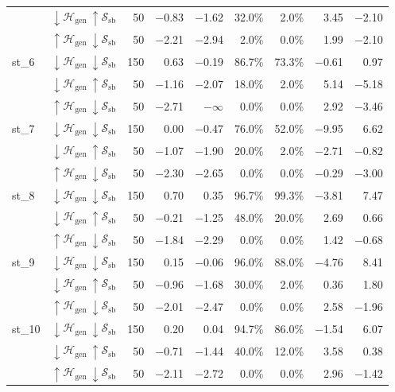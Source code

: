 \begin{tabular}{llrrrrrrr}
 & $\downarrow \mathcal{H}_\mathrm{gen}\ \uparrow \mathcal{S}_\mathrm{sb}$ & 50 & $-$0.83 & $-$1.62 & 32.0\% & 2.0\% & 3.45 & $-$2.10 \\
 & $\uparrow \mathcal{H}_\mathrm{gen}\ \downarrow \mathcal{S}_\mathrm{sb}$ & 50 & $-$2.21 & $-$2.94 & 2.0\% & 0.0\% & 1.99 & $-$2.10 \\
\midrule
st\_6 & $\downarrow \mathcal{H}_\mathrm{gen}\ \downarrow \mathcal{S}_\mathrm{sb}$ & 150 & 0.63 & $-$0.19 & 86.7\% & 73.3\% & $-$0.61 & 0.97 \\
 & $\downarrow \mathcal{H}_\mathrm{gen}\ \uparrow \mathcal{S}_\mathrm{sb}$ & 50 & $-$1.16 & $-$2.07 & 18.0\% & 2.0\% & 5.14 & $-$5.18 \\
 & $\uparrow \mathcal{H}_\mathrm{gen}\ \downarrow \mathcal{S}_\mathrm{sb}$ & 50 & $-$2.71 & $-\infty$ & 0.0\% & 0.0\% & 2.92 & $-$3.46 \\
\midrule
st\_7 & $\downarrow \mathcal{H}_\mathrm{gen}\ \downarrow \mathcal{S}_\mathrm{sb}$ & 150 & 0.00 & $-$0.47 & 76.0\% & 52.0\% & $-$9.95 & 6.62 \\
 & $\downarrow \mathcal{H}_\mathrm{gen}\ \uparrow \mathcal{S}_\mathrm{sb}$ & 50 & $-$1.07 & $-$1.90 & 20.0\% & 2.0\% & $-$2.71 & $-$0.82 \\
 & $\uparrow \mathcal{H}_\mathrm{gen}\ \downarrow \mathcal{S}_\mathrm{sb}$ & 50 & $-$2.30 & $-$2.65 & 0.0\% & 0.0\% & $-$0.29 & $-$3.00 \\
\midrule
st\_8 & $\downarrow \mathcal{H}_\mathrm{gen}\ \downarrow \mathcal{S}_\mathrm{sb}$ & 150 & 0.70 & 0.35 & 96.7\% & 99.3\% & $-$3.81 & 7.47 \\
 & $\downarrow \mathcal{H}_\mathrm{gen}\ \uparrow \mathcal{S}_\mathrm{sb}$ & 50 & $-$0.21 & $-$1.25 & 48.0\% & 20.0\% & 2.69 & 0.66 \\
 & $\uparrow \mathcal{H}_\mathrm{gen}\ \downarrow \mathcal{S}_\mathrm{sb}$ & 50 & $-$1.84 & $-$2.29 & 0.0\% & 0.0\% & 1.42 & $-$0.68 \\
\midrule
st\_9 & $\downarrow \mathcal{H}_\mathrm{gen}\ \downarrow \mathcal{S}_\mathrm{sb}$ & 150 & 0.15 & $-$0.06 & 96.0\% & 88.0\% & $-$4.76 & 8.41 \\
 & $\downarrow \mathcal{H}_\mathrm{gen}\ \uparrow \mathcal{S}_\mathrm{sb}$ & 50 & $-$0.96 & $-$1.68 & 30.0\% & 2.0\% & 0.36 & 1.80 \\
 & $\uparrow \mathcal{H}_\mathrm{gen}\ \downarrow \mathcal{S}_\mathrm{sb}$ & 50 & $-$2.01 & $-$2.47 & 0.0\% & 0.0\% & 2.58 & $-$1.96 \\
\midrule
st\_10 & $\downarrow \mathcal{H}_\mathrm{gen}\ \downarrow \mathcal{S}_\mathrm{sb}$ & 150 & 0.20 & 0.04 & 94.7\% & 86.0\% & $-$1.54 & 6.07 \\
 & $\downarrow \mathcal{H}_\mathrm{gen}\ \uparrow \mathcal{S}_\mathrm{sb}$ & 50 & $-$0.71 & $-$1.44 & 40.0\% & 12.0\% & 3.58 & 0.38 \\
 & $\uparrow \mathcal{H}_\mathrm{gen}\ \downarrow \mathcal{S}_\mathrm{sb}$ & 50 & $-$2.11 & $-$2.72 & 0.0\% & 0.0\% & 2.96 & $-$1.42 \\
\bottomrule
\end{tabular}
